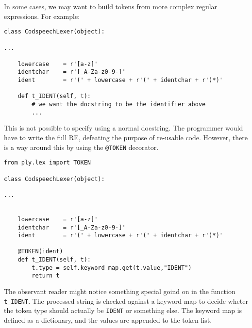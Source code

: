 In some cases, we may want to build tokens from more complex regular
expressions. For example:

\begin{lstlisting}
class CodspeechLexer(object):

...

    lowercase    = r'[a-z]'
    identchar    = r'[_A-Za-z0-9-]'
    ident        = r'(' + lowercase + r'(' + identchar + r')*)'

    def t_IDENT(self, t):
        # we want the docstring to be the identifier above
        ...
\end{lstlisting}

\noindent This is not possible to specify using a normal docstring. The
programmer would have to write the full RE, defeating the purpose of
re-usable code. However, there is a way around this by using the
\texttt{@TOKEN} decorator.

\begin{lstlisting}
from ply.lex import TOKEN

class CodspeechLexer(object):

...


    lowercase    = r'[a-z]'
    identchar    = r'[_A-Za-z0-9-]'
    ident        = r'(' + lowercase + r'(' + identchar + r')*)'

    @TOKEN(ident)
    def t_IDENT(self, t):
        t.type = self.keyword_map.get(t.value,"IDENT")
        return t
\end{lstlisting}

The observant reader might notice something special goind on in the
function \texttt{t_IDENT}. The processed string is checked against a
keyword map to decide wheter the token type should actually be
\texttt{IDENT} or something else. The keyword map is defined as a
dictionary, and the values are appended to the token list.

